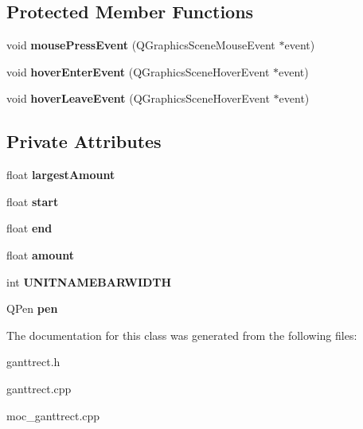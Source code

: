 \subsection*{Protected Member Functions}
\begin{DoxyCompactItemize}
\item 
\hypertarget{class_gantt_rect_a86e51a147edf6df229f1aad0a5089481}{}void {\bfseries mouse\+Press\+Event} (Q\+Graphics\+Scene\+Mouse\+Event $\ast$event)\label{class_gantt_rect_a86e51a147edf6df229f1aad0a5089481}

\item 
\hypertarget{class_gantt_rect_ad98eae638288375964942f34c4d315de}{}void {\bfseries hover\+Enter\+Event} (Q\+Graphics\+Scene\+Hover\+Event $\ast$event)\label{class_gantt_rect_ad98eae638288375964942f34c4d315de}

\item 
\hypertarget{class_gantt_rect_a3b2e69fe42463cedddb5e3cd8c2a88b1}{}void {\bfseries hover\+Leave\+Event} (Q\+Graphics\+Scene\+Hover\+Event $\ast$event)\label{class_gantt_rect_a3b2e69fe42463cedddb5e3cd8c2a88b1}

\end{DoxyCompactItemize}
\subsection*{Private Attributes}
\begin{DoxyCompactItemize}
\item 
\hypertarget{class_gantt_rect_a87c303488aa50b2b26dacc4641a50ccb}{}float {\bfseries largest\+Amount}\label{class_gantt_rect_a87c303488aa50b2b26dacc4641a50ccb}

\item 
\hypertarget{class_gantt_rect_a0146f1175f8a38f825f7bc0dd9ead993}{}float {\bfseries start}\label{class_gantt_rect_a0146f1175f8a38f825f7bc0dd9ead993}

\item 
\hypertarget{class_gantt_rect_aa730838f983a964aecd07f1888703841}{}float {\bfseries end}\label{class_gantt_rect_aa730838f983a964aecd07f1888703841}

\item 
\hypertarget{class_gantt_rect_a49e581012b987f5038403b25427dabe7}{}float {\bfseries amount}\label{class_gantt_rect_a49e581012b987f5038403b25427dabe7}

\item 
\hypertarget{class_gantt_rect_a3224a003c0ef465f535c0c7e077b1e4f}{}int {\bfseries U\+N\+I\+T\+N\+A\+M\+E\+B\+A\+R\+W\+I\+D\+T\+H}\label{class_gantt_rect_a3224a003c0ef465f535c0c7e077b1e4f}

\item 
\hypertarget{class_gantt_rect_a6ed153f381b086ad680e83da17662886}{}Q\+Pen {\bfseries pen}\label{class_gantt_rect_a6ed153f381b086ad680e83da17662886}

\end{DoxyCompactItemize}


The documentation for this class was generated from the following files\+:\begin{DoxyCompactItemize}
\item 
ganttrect.\+h\item 
ganttrect.\+cpp\item 
moc\+\_\+ganttrect.\+cpp\end{DoxyCompactItemize}
